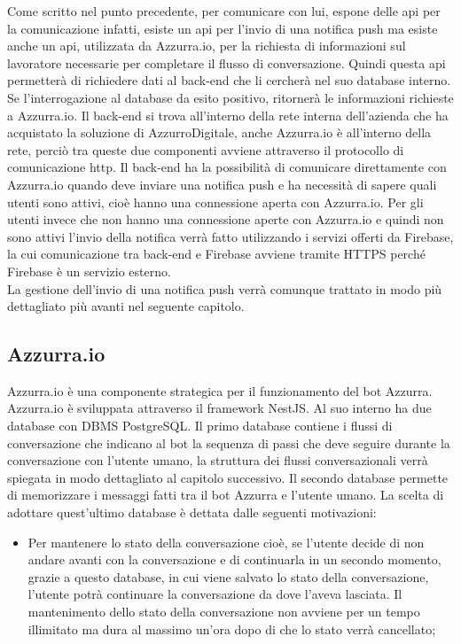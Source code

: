 \begin{trivlist}
	Come scritto nel punto precedente, per comunicare con lui, espone delle \gls{api}\ap{[g]} per la comunicazione infatti, esiste un \gls{api}\ap{[g]} per l'invio di una \gls{notifica push}\ap{[g]} ma esiste anche un \gls{api}\ap{[g]}, utilizzata da Azzurra.io, per la richiesta di informazioni sul lavoratore necessarie per completare il flusso di conversazione. Quindi questa \gls{api}\ap{[g]} permetterà di richiedere dati al back-end che li cercherà nel suo database interno. Se l'interrogazione al database da esito positivo, ritornerà le informazioni richieste a Azzurra.io. Il back-end si trova all'interno della rete interna dell'azienda che ha acquistato la soluzione di AzzurroDigitale, anche Azzurra.io è all'interno della rete, perciò tra queste due componenti avviene attraverso il protocollo di comunicazione \gls{http}\ap{[g]}\glsfirstoccur. Il back-end ha la possibilità di comunicare direttamente con Azzurra.io quando deve inviare una \gls{notifica push}\ap{[g]} e ha necessità di sapere quali utenti sono attivi, cioè hanno una connessione aperta con Azzurra.io. Per gli utenti invece che non hanno una connessione aperte con Azzurra.io e quindi non sono attivi l'invio della notifica verrà fatto utilizzando i servizi offerti da Firebase, la cui comunicazione tra back-end e Firebase avviene tramite HTTPS perché Firebase è un servizio esterno.\\
	La gestione dell'invio di una \gls{notifica push}\ap{[g]} verrà comunque trattato in modo più dettagliato più avanti nel seguente capitolo.
	\item \subsection{Azzurra.io}
	Azzurra.io è una componente strategica per il funzionamento del \gls{bot}\ap{[g]} Azzurra. Azzurra.io è sviluppata attraverso il \gls{framework}\ap{[g]} NestJS. Al suo interno ha due database con DBMS PostgreSQL. Il primo database contiene i flussi di conversazione che indicano al \gls{bot}\ap{[g]} la sequenza di passi che deve seguire durante la conversazione con l'utente umano, la struttura dei flussi conversazionali verrà spiegata in modo dettagliato al capitolo successivo. Il secondo database permette di memorizzare i messaggi fatti tra il \gls{bot}\ap{[g]} Azzurra e l'utente umano. La scelta di adottare quest'ultimo database è dettata dalle seguenti motivazioni:
	\begin{itemize}
		\item Per mantenere lo stato della conversazione cioè, se l'utente decide di non andare avanti con la conversazione e di continuarla in un secondo momento, grazie a questo database, in cui viene salvato lo stato della conversazione, l'utente potrà continuare la conversazione da dove l'aveva lasciata. Il mantenimento dello stato della conversazione non avviene per un tempo illimitato ma dura al massimo un'ora dopo di che lo stato verrà cancellato;

\end{itemize}
\end{trivlist}
